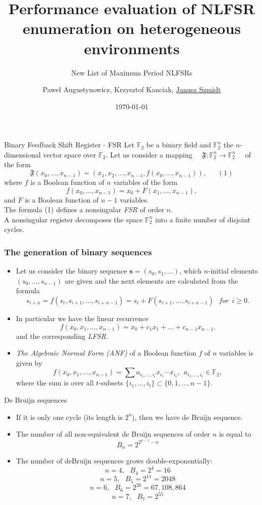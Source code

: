 \documentclass[10pt, compress]{beamer}
\title[Performance evaluation of NLFSR enumeration]{Performance evaluation of NLFSR enumeration on heterogeneous environments}
\subtitle{New List of Maximum Period NLFSRs}
\date{\today}
\author{Paweł Augustynowicz, Krzysztof Kanciak, \underline{Janusz Szmidt}}
\institute[shortinst]{Faculty of Cybernetics, Military University of Technology, Warsaw\\
Military Communication Institute, Department of Cryptology, Zegrze}
\begin{document}
\maketitle

\begin{frame}{Binary Feedback Shift Register - FSR}
Let $ \mathbb{F}_2 $ be a binary field and $ \mathbb{F}^{n}_2 $ the $ n $-dimensional vector space over $ \mathbb{F}_2 $.
Let us consider a mapping \ \ $ \mathfrak{F}: \mathbb{F}^{n}_2\rightarrow\mathbb{F}^{n}_2 $ \ \
of the form
\[ \mathfrak{F}(x_0, \ldots , x_{n-1})=(x_1, x_2, \ldots , x_{n-1}, f(x_0, \ldots , x_{n-1})), \ \ \ \ \ \ \ (1) \]
where $f$ is a Boolean function of $n$ variables of the form
\[ f(x_0, \ldots , x_{n-1})=x_0 + F(x_1, \ldots , x_{n-1}),  \]
and $ F $ is a Boolean function of $ n-1 $ variables. \\
The formula (1) defines a nonsingular \textit{FSR} of order $ n $. \\
A nonsingular register decomposes the space  $ \mathbb{F}^{n}_2 $ into a finite number of disjoint cycles.
\end{frame}

\begin{frame}
\frametitle{The generation of binary sequences}
\begin{itemize}
\item Let us consider the binary sequence $ \textbf{s} = (s_{0}, s_{1}, \ldots ) $, which $ n $-initial elements $ (s_{0}, \ldots , s_{n-1}) $ are given and the next elements are calculated from the formula
\[s_{i+n} = f(s_{i}, s_{i+1}, \ldots , s_{i+n-1}) 
= s_i + F(s_{i+1}, \ldots , s_{i+n-1}) \ \ \ for  \ \ i \geq 0 .\]
\item In particular we have the linear recurrence
\[ f(x_{0}, x_{1}, \ldots , x_{n-1}) = x_{0} +  c_{1}x_{1} + \ldots + c_{n-1}x_{n-1}. \]
and the corresponding \textit{LFSR.}
\item  \emph{The Algebraic Normal Form (ANF)} of a Boolean function $ f $ of $ n $ variables is given by
\[f(x_{0}, x_{1}, \ldots , x_{n-1})=\sum a_{i_{1}, \ldots , i_{t}} x_{i_{1}} \cdots x_{i_{t}} , \ \ a_{i_{1}, \ldots , i_{t}} \in \mathbb{F}_{2} ,\]
where the sum is over all  $ t $-subsets $ \{ i_{1}, \ldots , i_{t} \} \subset \{0, 1, \ldots , n-1 \}.$
\end{itemize}
\end{frame}

\begin{frame}{De Bruijn sequences}
\begin{itemize}
\item If it is only one cycle (its length is $ 2^n $), then we have de Bruijn sequence.
\item The number of all non-equivalent de Bruijn sequences of order $ n $ is equal to
\[ B_{n} = 2^{2^{n-1}-n} \]
\item The number of deBruijn sequences grows double-exponentially:
\[ n = 4, \ \ \ B_4 = 2^4 = 16 \]
\[ n = 5, \ \ \ B_5 = 2^{11} = 2048 \]
\[ n = 6, \ \ \ B_6 = 2^{26} = 67,108, 864 \]
\[ n = 7, \ \ \ B_7 = 2^{55} \] 
\end{itemize}
\end{frame}
\end{document}

